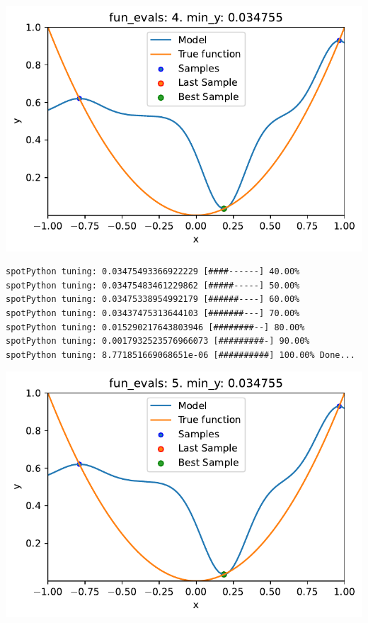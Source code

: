 \documentclass[
  letterpaper,
  DIV=11,
  numbers=noendperiod]{scrreprt}
\begin{document}
\includegraphics{010_num_spot_sklearn_surrogate_files/figure-pdf/cell-39-output-2.pdf}

\begin{verbatim}
spotPython tuning: 0.03475493366922229 [####------] 40.00% 
spotPython tuning: 0.03475483461229862 [#####-----] 50.00% 
spotPython tuning: 0.03475338954992179 [######----] 60.00% 
spotPython tuning: 0.03437475313644103 [#######---] 70.00% 
spotPython tuning: 0.015290217643803946 [########--] 80.00% 
spotPython tuning: 0.0017932523576966073 [#########-] 90.00% 
spotPython tuning: 8.771851669068651e-06 [##########] 100.00% Done...
\end{verbatim}

\includegraphics{010_num_spot_sklearn_surrogate_files/figure-pdf/cell-39-output-4.pdf}
\end{document}
